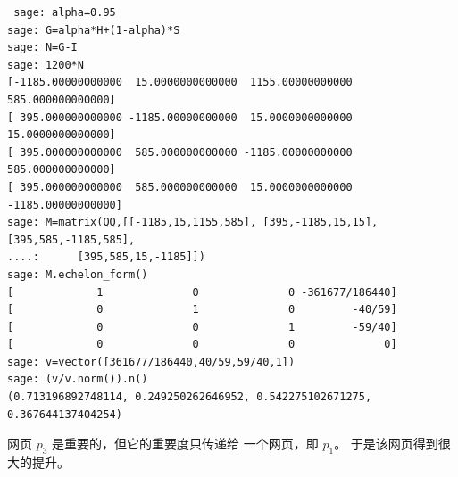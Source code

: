 \begin{exercises}
\begin{answer}
\begin{exparts}
\begin{lstlisting}
 sage: alpha=0.95
sage: G=alpha*H+(1-alpha)*S
sage: N=G-I
sage: 1200*N
[-1185.00000000000  15.0000000000000  1155.00000000000  585.000000000000]
[ 395.000000000000 -1185.00000000000  15.0000000000000  15.0000000000000]
[ 395.000000000000  585.000000000000 -1185.00000000000  585.000000000000]
[ 395.000000000000  585.000000000000  15.0000000000000 -1185.00000000000]
sage: M=matrix(QQ,[[-1185,15,1155,585], [395,-1185,15,15], [395,585,-1185,585],
....:      [395,585,15,-1185]])
sage: M.echelon_form()
[             1              0              0 -361677/186440]
[             0              1              0         -40/59]
[             0              0              1         -59/40]
[             0              0              0              0]
sage: v=vector([361677/186440,40/59,59/40,1])
sage: (v/v.norm()).n()
(0.713196892748114, 0.249250262646952, 0.542275102671275, 0.367644137404254)
\end{lstlisting}
       \item 网页 $p_3$ 是重要的，但它的重要度只传递给
         一个网页，即 $p_1$。
         于是该网页得到很大的提升。
      \end{exparts}    
    \end{answer}
\end{exercises}
\endinput
